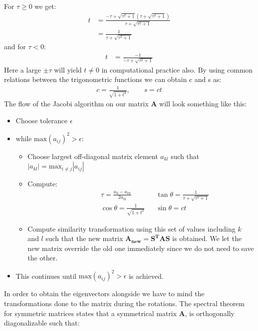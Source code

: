 \documentclass[american,a4paper,12pt]{article}
\renewcommand{\vec}[1]{\mathbf{#1}} %
\begin{document}
For $\tau \ge 0$ we get: 
\begin{align*}
    t &= \frac{-\tau + \sqrt{\tau^2 + 1}(\tau + \sqrt{\tau^2 + 1})}{\tau + \sqrt{\tau^2 + 1}} \\
     &= \frac{1}{\tau + \sqrt{\tau^2 + 1}}
\end{align*}
and for $\tau < 0$:
\begin{align*}
    t &= \frac{-1}{-\tau + \sqrt{\tau^2 + 1}}
\end{align*}
Here a large $\pm \tau$ will yield $t \ne 0$ in computational practice also. By using common relations between the trigonometric functions we can obtain c and s as:
\begin{align*}
    c = \frac{1}{\sqrt{1+ t^2}}, \qquad s = ct
\end{align*}
The flow of the Jacobi algorithm on our matrix $\vec{A}$ will look something like this:
\begin{itemize}
    \item Choose tolerance $\epsilon$
    \item while $\text{max}(a_{ij})^2 > \epsilon$:
        \begin{itemize}
            \item Choose largest off-diagonal matrix element $a_{kl}$ such that $|a_{kl}| = \text{max}_{i \ne j}|a_{ij}|$
            \item Compute:
                \begin{align*}
                    & \qquad \qquad \tau = \frac{a_{ll} - a_{kk}}{2a_{kl}}&  &\tan{\theta}= \frac{1}{\tau + \sqrt{\tau^2 + 1}}& \\ 
                    & \qquad \qquad \cos{\theta} = \frac{1}{\sqrt{1+ t^2}}&  &\sin{\theta} = ct&
                \end{align*}
            \item Compute similarity transformation using this set of values including $k$ and $l$ such that the new matrix $\vec{A_{new}} = \vec{S^T}\vec{A}\vec{S}$ is obtained. We let the new matrix override the old one immediately since we do not need to save the other.
            \end{itemize}
    \item This continues until $\text{max}(a_{ij})^2 > \epsilon$ is achieved. 
\end{itemize}
In order to obtain the eigenvectors alongside we have to mind the transformations done to the matrix during the rotations. The spectral theorem for symmetric matrices states that a symmetrical matrix $\vec{A}$, is orthogonally diagonalizable such that:
\end{document}
